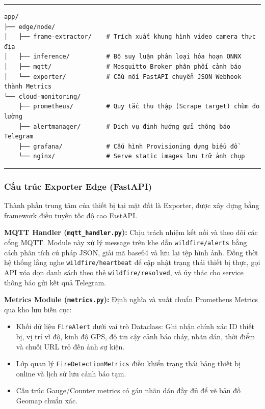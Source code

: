 \documentclass[12pt,a4paper]{report}
\begin{document}
\begin{table}[htbp]
  \centering
  \caption{Cấu trúc thư mục ứng dụng chức năng}
  \label{code:app_dir}
  \hrule
  \vspace{2mm}
  \begin{minipage}{0.9\textwidth}
    \small
\begin{verbatim}
app/
├── edge/node/
│   ├── frame-extractor/    # Trích xuất khung hình video camera thực địa
│   ├── inference/          # Bộ suy luận phân loại hỏa hoạn ONNX
│   ├── mqtt/               # Mosquitto Broker phân phối cảnh báo
│   └── exporter/           # Cầu nối FastAPI chuyển JSON Webhook thành Metrics
└── cloud-monitoring/
    ├── prometheus/         # Quy tắc thu thập (Scrape target) chùm đo lường
    ├── alertmanager/       # Dịch vụ định hướng gửi thông báo Telegram
    ├── grafana/            # Cấu hình Provisioning dựng biểu đồ
    └── nginx/              # Serve static images lưu trữ ảnh chụp
\end{verbatim}
  \end{minipage}
  \vspace{2mm}
  \hrule
\end{table}

\subsubsection{Cấu trúc Exporter Edge (FastAPI)}

Thành phần trung tâm của thiết bị tại mặt đất là Exporter, được xây dựng bằng framework điều tuyến tốc độ cao FastAPI. 

\textbf{MQTT Handler (\texttt{mqtt\_handler.py}):} Chịu trách nhiệm kết nối và theo dõi các cổng MQTT. Module này xử lý message trên khe dẫn \texttt{wildfire/alerts} bằng cách phân tích cú pháp JSON, giải mã base64 và lưu lại tệp hình ảnh. Đồng thời hệ thống lắng nghe \texttt{wildfire/heartbeat} để cập nhật trạng thái thiết bị thực, gọi API xóa dọn danh sách theo thẻ \texttt{wildfire/resolved}, và ủy thác cho service thông báo gửi kết quả Telegram.

\textbf{Metrics Module (\texttt{metrics.py}):} Định nghĩa và xuất chuẩn Prometheus Metrics qua kho lưu biến cục:
\begin{itemize}
  \item Khối dữ liệu \texttt{FireAlert} dưới vai trò Dataclass: Ghi nhận chính xác ID thiết bị, vị trí vĩ độ, kinh độ GPS, độ tin cậy cảnh báo cháy, nhãn dán, thời điểm và chuỗi URL trỏ đến ảnh sự kiện.
  \item Lớp quan lý \texttt{FireDetectionMetrics} điều khiển trạng thái bảng thiết bị online và lịch sử lưu cảnh báo tạm.
  \item Cấu trúc Gauge/Counter metrics có gán nhãn dán đầy đủ để vẽ bản đồ Geomap chuẩn xác.
\end{itemize}
\end{document}
